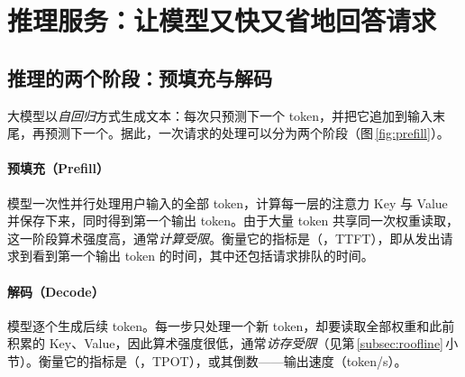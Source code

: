 \section{推理服务：让模型又快又省地回答请求}
\label{sec:infer}

\begin{guide}
\begin{minipage}[c]{0.66\linewidth}
\end{minipage}\hfill
\begin{minipage}[c]{0.3\linewidth}\centering{}\end{minipage}
\end{guide}

\subsection{推理的两个阶段：预填充与解码}
\label{subsec:prefill-decode}

大模型以\emph{自回归}方式生成文本：每次只预测下一个 token，并把它追加到输入末尾，再预测下一个。据此，一次请求的处理可以分为两个阶段（图\,\ref{fig:prefill}）。

\paragraph{预填充（Prefill）} 模型一次性并行处理用户输入的全部 token，计算每一层的注意力 Key 与 Value 并保存下来，同时得到第一个输出 token。由于大量 token 共享同一次权重读取，这一阶段算术强度高，通常\emph{计算受限}。衡量它的指标是（，TTFT），即从发出请求到看到第一个输出 token 的时间，其中还包括请求排队的时间。

\paragraph{解码（Decode）} 模型逐个生成后续 token。每一步只处理一个新 token，却要读取全部权重和此前积累的 Key、Value，因此算术强度很低，通常\emph{访存受限}（见第\,\ref{subsec:roofline}\,小节）。衡量它的指标是（，TPOT），或其倒数——输出速度（token/s）。



